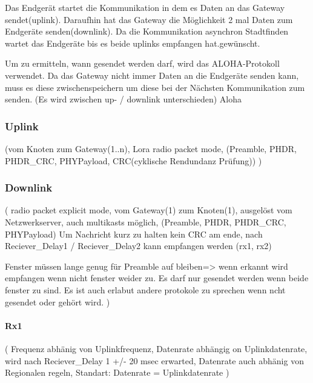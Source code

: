 \documentclass[a4paper,12pt]{article}
\begin{document}
            Das Endgerät startet die Kommunikation in dem es Daten an das Gateway sendet(uplink). Daraufhin hat das Gateway die Möglichkeit 2 mal Daten zum Endgeräte senden(downlink). Da die Kommunikation asynchron Stadtfinden wartet das Endgeräte bis es beide uplinks empfangen hat.gewünscht.
            
            Um zu ermitteln, wann gesendet werden darf, wird das ALOHA-Protokoll verwendet.
            Da das Gateway nicht immer Daten an die Endgeräte senden kann, muss es diese zwischenspeichern um diese bei der Nächsten Kommunikation zum senden.
            \cite{LoRaSpec}(Es wird zwischen up- / downlink unterschieden) Aloha
           
            \subsubsection{Uplink}

                \cite{LoRaSpec} 
                    (vom Knoten zum Gateway(1..n), Lora radio packet mode, (Preamble, PHDR, PHDR\_CRC, PHYPayload, CRC(cyklische Rendundanz Prüfung))
                 )

            \subsubsection{Downlink}

                \cite{LoRaSpec}
                (
                    radio packet explicit mode, vom Gateway(1) zum Knoten(1), ausgelöst vom Netzwerkserver, auch multikasts möglich, (Preamble, PHDR, PHDR\_CRC, PHYPayload)
                Um Nachricht kurz zu halten kein CRC am ende, nach Reciever\_Delay1 / Reciever\_Delay2 kann empfangen werden (rx1, rx2) 
                
                Fenster müssen lange genug für Preamble auf bleiben=> wenn erkannt wird empfangen wenn nicht fenster weider zu. Es darf nur gesendet werden wenn beide fenster zu sind.
                Es ist auch erlabut andere protokole zu sprechen wenn ncht gesendet oder gehört wird.
                )
                \paragraph{Rx1}
                    \cite{LoRaSpec}(
                        Frequenz abhänig von Uplinkfrequenz, Datenrate abhängig on Uplinkdatenrate, wird nach Reciever\_Delay 1 +/- 20 msec erwarted, Datenrate auch abhänig von Regionalen regeln, Standart: Datenrate = Uplinkdatenrate
                    )
\end{document}
